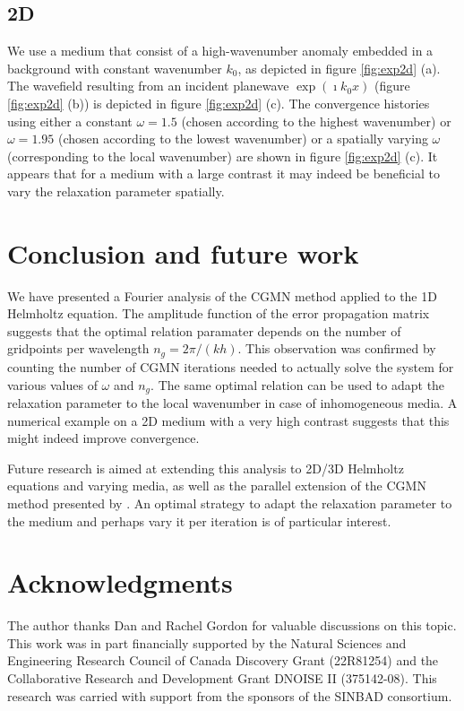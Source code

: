 \documentclass{article}
\begin{document}
\subsection{2D}
We use a medium that consist of a high-wavenumber anomaly embedded in a background with constant
wavenumber $k_0$, as depicted in figure \ref{fig:exp2d} (a). The wavefield resulting
from an incident planewave $\exp(\imath k_0 x)$ (figure \ref{fig:exp2d} (b)) is depicted in figure \ref{fig:exp2d} (c). 
The convergence histories using either a constant $\omega=1.5$ (chosen according to the highest wavenumber)
 or $\omega=1.95$ (chosen according to the lowest wavenumber) or a spatially varying $\omega$ (corresponding to the local wavenumber)
 are shown in figure \ref{fig:exp2d} (c). 
It appears that for a medium with a large contrast it may indeed be beneficial to vary the relaxation parameter
spatially.

\section{Conclusion and future work}
We have presented a Fourier analysis of the CGMN method applied to the 1D Helmholtz equation.
The amplitude function of the error propagation matrix
suggests that the optimal relation paramater depends on the number of gridpoints per wavelength 
$n_g=2\pi/(kh)$. This observation was confirmed by counting the number of CGMN iterations needed to actually solve
the system for various values of $\omega$ and $n_g$. The same optimal relation can be used to 
adapt the relaxation parameter to the local wavenumber in case of inhomogeneous media. A numerical example
on a 2D medium with a very high contrast suggests that this might indeed improve convergence.

Future research is aimed at extending this analysis to
2D/3D Helmholtz equations and varying media, as well as the parallel extension of the CGMN method presented by \cite{Gordon2013}.
An optimal strategy to adapt the relaxation parameter to the medium and perhaps
vary it per iteration is of particular interest.

\clearpage
\section*{Acknowledgments}
The author thanks Dan and Rachel Gordon for valuable discussions on this topic.
This work was in part financially supported by the Natural Sciences and 
Engineering Research Council of Canada Discovery Grant (22R81254) and the 
Collaborative Research and Development Grant DNOISE II (375142-08). 
This research was carried with support from the sponsors of the SINBAD consortium.
\end{document}
